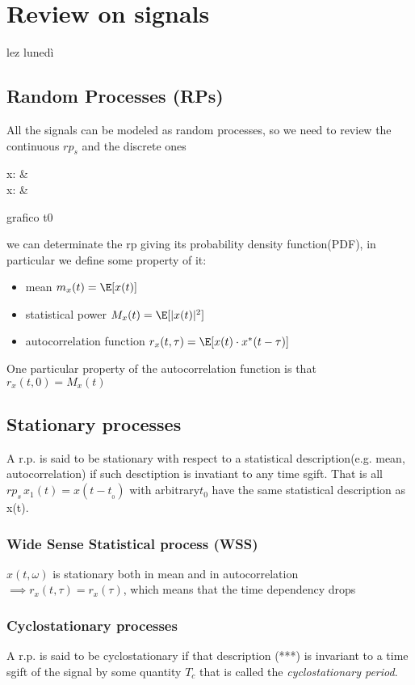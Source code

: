 \chapter{Review on signals}

lez lunedì

\section{Random Processes (RPs)}
All the signals can be modeled as random processes, so we need to review the continuous $rp_s$ and the discrete ones

\begin{esp}
  x: \quad &\R \times \Omega \to \R \\
  x:  \quad& \Z \times \Omega \to \R
\end{esp}

grafico t0

we can determinate the rp giving its probability density function(PDF), in particular we define some property of it:
\begin{itemize}
  \item mean $m_x(t)=\E[x(t)]$
  \item statistical power $M_x(t)=\E[|x(t)|^2]$
  \item autocorrelation function $r_x(t,\tau)=\E[x(t)\cdot x^*(t-\tau)]$
\end{itemize}
One particular property of the autocorrelation function is that $r_x(t,0)=M_x(t)$

\section{Stationary processes}
A r.p. is said to be stationary with respect to a statistical description(e.g. mean, autocorrelation) if such desctiption is invatiant to any time sgift. That is all $rp_s \, x_1(t) = x(t-t_{_0})$ with arbitrary$t_0$ have the same statistical description as x(t).

\subsection{Wide Sense Statistical process (WSS)}
$x(t,\omega)$ is stationary both in mean and in autocorrelation $\implies r_x(t,\tau) = r_x(\tau)$, which means that the time dependency drops

\subsection{Cyclostationary processes}
A r.p. is said to be cyclostationary if that description (***) is invariant to a time sgift of the signal by some quantity $T_c$ that is called the \emph{cyclostationary period}.

